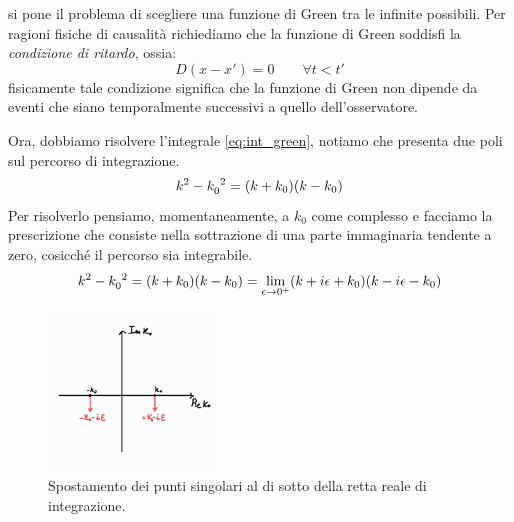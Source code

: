 si pone il problema di scegliere una funzione di Green tra le infinite possibili.
Per ragioni fisiche di causalità richiediamo che la funzione di Green soddisfi la \textit{condizione di ritardo}, ossia:
\begin{equation}
    D(x-x')=0 \qquad \forall t<t'
\end{equation}
fisicamente tale condizione significa che la funzione di Green non dipende da eventi che siano temporalmente successivi a quello dell'osservatore. 

Ora, dobbiamo risolvere l'integrale \eqref{eq:int_green}, notiamo che presenta due poli sul percorso di integrazione. 
\begin{equation}
    k^2-k\indices{_0^2}=(k+k_0)(k-k_0)
\end{equation}
Per risolverlo pensiamo, momentaneamente, a $k_0$ come complesso e facciamo la prescrizione che consiste nella sottrazione di una parte immaginaria tendente a zero, cosicché il percorso sia integrabile.
\begin{equation}
    k^2-k\indices{_0^2}=(k+k_0)(k-k_0)=\lim_{\epsilon\to0^+} (k+i\epsilon+k_0)(k-i\epsilon-k_0)
\end{equation}
\begin{figure}[H]
    \centering
    \includegraphics[width=0.40\textwidth]{Immagini/Prescrizione.jpg}
    \caption{Spostamento dei punti singolari al di sotto della retta reale di integrazione.}
    \label{fig:prescrizione}
\end{figure}

